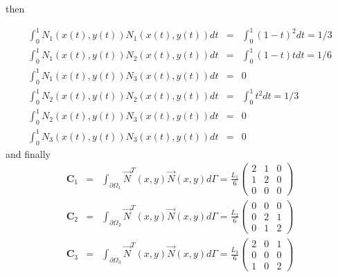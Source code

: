 then 

\begin{eqnarray}
\int_{0}^1 N_1(x(t),y(t))N_1(x(t),y(t)) dt 
&=& \int_{0}^1 (1-t)^2 dt = 1/3 \\ 
\int_{0}^1 N_1(x(t),y(t))N_2(x(t),y(t)) dt 
&=& \int_{0}^1 (1-t)t dt = 1/6 \\ 
\int_{0}^1 N_1(x(t),y(t))N_3(x(t),y(t)) dt
&=& 0 \\
\int_{0}^1 N_2(x(t),y(t))N_2(x(t),y(t)) dt 
&=& \int_{0}^1 t^2 dt = 1/3 \\ 
\int_{0}^1 N_2(x(t),y(t))N_3(x(t),y(t)) dt
&=& 0 \\
\int_{0}^1 N_3(x(t),y(t))N_3(x(t),y(t)) dt
&=& 0 
\end{eqnarray}
and finally 
\begin{eqnarray}
{\bm C}_1
&=&\int_{\partial\Omega_1} \vec{N}^T(x,y) \vec{N}(x,y) d\Gamma 
= \frac{L_1}{6}
\left(
\begin{array}{ccc}
2 & 1 & 0 \\
1 & 2 & 0 \\
0 & 0 & 0 
\end{array}
\right) \\
{\bm C}_2 &=&\int_{\partial\Omega_2} \vec{N}^T(x,y) \vec{N}(x,y) d\Gamma 
= \frac{L_2}{6}
\left(
\begin{array}{ccc}
0 & 0 & 0 \\
0 & 2 & 1 \\
0 & 1 & 2 
\end{array}
\right) \\
{\bm C}_3 &=&\int_{\partial\Omega_3} \vec{N}^T(x,y) \vec{N}(x,y) d\Gamma 
= \frac{L_3}{6}
\left(
\begin{array}{ccc}
2 & 0 & 1 \\
0 & 0 & 0 \\
1 & 0 & 2 
\end{array}
\right) 
\end{eqnarray}





